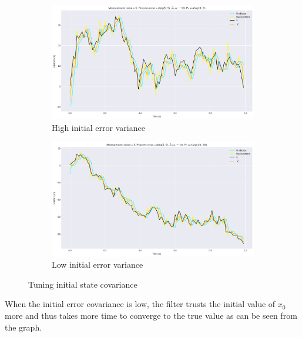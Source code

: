 \documentclass[11pt]{article}
\begin{document}
\begin{figure}[H]
    \centering
    \begin{subfigure}[H]{0.49\linewidth}
        \includegraphics[width=\linewidth]{../kfcov3.png}
        \caption*{High initial error variance}
    \end{subfigure}
    \begin{subfigure}[H]{0.49\linewidth}
        \includegraphics[width=\linewidth]{../kfcov4.png}
        \caption*{Low initial error variance}
    \end{subfigure}
    \caption*{Tuning initial state covariance}
\end{figure}
When the initial error covariance is low, the filter trusts the initial value of $x_0$ more and thus
takes more time to converge to the true value as can be seen from the graph. 
\end{document}

